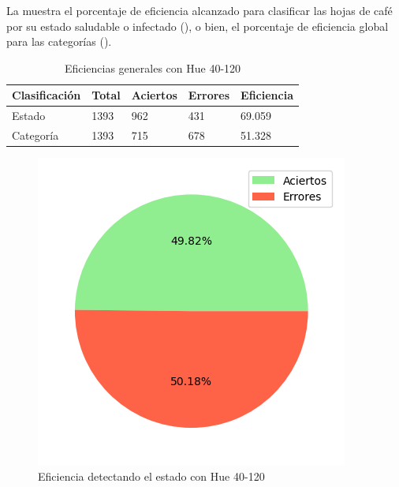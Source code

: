 La  muestra el porcentaje de eficiencia alcanzado para clasificar las hojas de café por su estado saludable o infectado (), o bien, el porcentaje de eficiencia global para las categorías ().

\begin{table}[h!]
\centering
\begin{tabular}{|l|l|l|l|l|}
\hline 
\textbf{Clasificación} & \textbf{Total} & \textbf{Aciertos} & \textbf{Errores} & \textbf{Eficiencia} \\
\hline
Estado & 1393 & 962 & 431 & 69.059 \\
\hline 
Categoría & 1393 & 715 & 678 & 51.328 \\
\hline 
\end{tabular}
\caption{Eficiencias generales con Hue 40-120}
\label{table:efficiency_general_40_120}
\end{table}

\captionsetup[figure]{skip=-10pt}

\begin{figure}[H]
\centering
\includegraphics[scale=0.6]{images/result_global_state_40_120.png}
\caption{Eficiencia detectando el estado con Hue 40-120}
\label{img:efficiency_state_40_120}
\end{figure}

